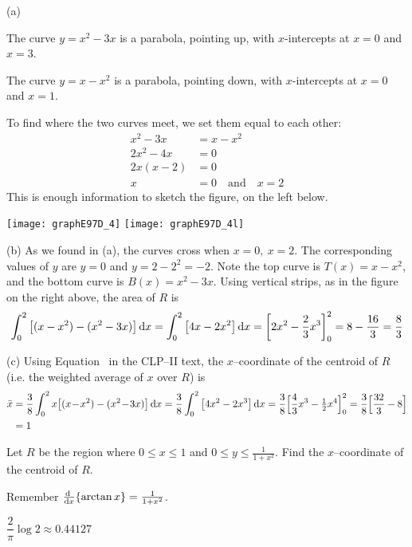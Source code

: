 \begin{solution} (a)

The curve $y=x^2-3x$ is a parabola, pointing up, with $x$-intercepts at $x=0$ and $x=3$.

The curve $y=x-x^2$ is a parabola, pointing down, with $x$-intercepts at $x=0$ and $x=1$.

To find where the two curves meet, we set them equal to each other:
\begin{align*}
x^2-3x&=x-x^2\\
2x^2-4x&=0\\
2x(x-2)&=0\\
x&=0\quad\text{and}\quad x=2
\end{align*}
This is enough information to sketch the figure, on the left below.

\begin{center}
       \texttt{[image: graphE97D\_4]}\qquad
       \texttt{[image: graphE97D\_4l]}
\end{center}



\noindent (b)
As we found in (a),
the curves cross when $ x=0,\
x=2$. The corresponding values of $y$ are $y=0$ and $y=2-2^2=-2$. Note the top curve is $T(x)=x-x^2$, and the bottom curve is $B(x)=x^2-3x$. Using
vertical strips, as in the figure on the  right above, the area of $R$ is
\begin{align*}
\int_0^2\big[(x-x^2)-(x^2-3x)\big]\,\mathrm{d}x
=\int_0^2\big[4x-2x^2\big]\,\mathrm{d}x
=\left[2x^2-\frac{2}{3}x^3\right]_0^2
=8-\frac{16}{3}=\frac{8}{3}
\end{align*}

\noindent (c)
Using Equation~ in the CLP--II text, the $x$--coordinate of the centroid of $R$ (i.e. the weighted average of
$x$ over $R$)  is
\begin{align*}
\bar x &= \frac{3}{8}\int_0^2x\big[(x\!-\!x^2)-(x^2\!-\!3x)\big]\,\mathrm{d}x
= \frac{3}{8}\int_0^2\big[4x^2-2x^3\big]\,\mathrm{d}x
= \frac{3}{8}\Big[\frac{4}{3}x^3-\tfrac{1}{2} x^4\Big]_0^2
= \frac{3}{8}\Big[\frac{32}{3}-8\Big] \\
&=1
\end{align*}

\end{solution}




\begin{question}[1998A]
Let $R$ be the region where $0\le x\le 1$ and $0\le y\le\frac{1}{1+x^2}$.
Find the $x$--coordinate of the centroid of $R$.
\end{question}
\begin{hint}
Remember $\diff{}{x}\{\arctan x\} = \frac{1}{1+x^2}$.
\end{hint}
\begin{answer}
$\dfrac{2}{\pi}\log 2\approx 0.44127$
\end{answer}

